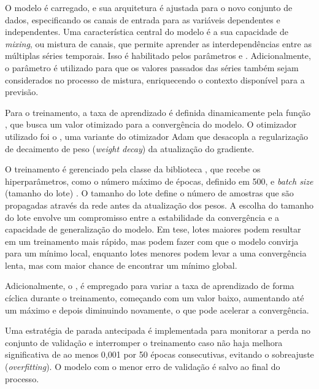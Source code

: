 O modelo  é carregado, e sua arquitetura é ajustada para o novo conjunto de dados, especificando 
os canais de entrada para as variáveis dependentes e independentes. Uma característica central do modelo é a sua capacidade de 
\textit{mixing}, ou mistura de canais, que permite aprender as interdependências entre as múltiplas séries temporais. Isso é 
habilitado pelos parâmetros  e . Adicionalmente, 
o parâmetro  é utilizado para que os valores passados das séries também sejam considerados no processo 
de mistura, enriquecendo o contexto disponível para a previsão.

Para o treinamento, a taxa de aprendizado  é definida dinamicamente pela função , 
que busca um valor otimizado para a convergência do modelo. O otimizador utilizado foi o , uma variante do otimizador 
Adam que desacopla a regularização de decaimento de peso (\textit{weight decay}) da atualização do gradiente.

O treinamento é gerenciado pela classe  da biblioteca , que recebe os hiperparâmetros, 
como o número máximo de épocas, definido em 500, e \textit{batch size} (tamanho do lote) . O tamanho
do lote define o número de amostras que são propagadas através da rede antes da atualização dos pesos. A escolha do tamanho
do lote envolve um compromisso entre a estabilidade da convergência e a capacidade de generalização do modelo. Em tese, 
lotes maiores podem resultar em um treinamento mais rápido, mas podem fazer com que o modelo convirja para um mínimo local, 
enquanto lotes menores podem levar a uma convergência lenta, mas com maior chance de encontrar um mínimo global.

Adicionalmente, o , é empregado para variar a taxa de aprendizado de forma cíclica durante o treinamento, 
começando com um valor baixo, aumentando até um máximo e depois diminuindo novamente, o que pode acelerar a convergência.

Uma estratégia de parada antecipada  é implementada para monitorar a perda no conjunto de validação 
e interromper o treinamento caso não haja melhora significativa de ao menos 0,001 por 50 épocas consecutivas, 
evitando o sobreajuste (\textit{overfitting}). O modelo com o menor erro de validação é salvo ao final do processo.